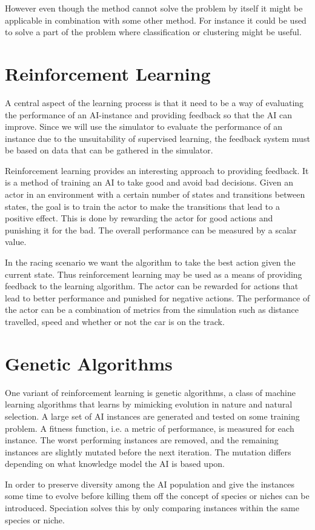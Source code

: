 However even though the method cannot solve the problem by itself it might be applicable in combination with some other method. For instance it could be used to solve a part of the problem where classification or clustering might be useful.

\section{Reinforcement Learning}
A central aspect of the learning process is that it need to be a way of evaluating the performance of an AI-instance and providing feedback so that the AI can improve. Since we will use the simulator to evaluate the performance of an instance due to the unsuitability of supervised learning, the feedback system must be based on data that can be gathered in the simulator. 

Reinforcement learning provides an interesting approach to providing feedback. It is a method of training an AI to take good and avoid bad decisions. Given an actor in an environment with a certain number of states and transitions between states, the goal is to train the actor to make the transitions that lead to a positive effect. This is done by rewarding the actor for good actions and punishing it for the bad.\cite{barber} The overall performance can be measured by a scalar value.

In the racing scenario we want the algorithm to take the best action given the current state. Thus reinforcement learning may be used as a means of providing feedback to the learning algorithm. The actor can be rewarded for actions that lead to better performance and punished for negative actions. The performance of the actor can be a combination of metrics from the simulation such as distance travelled, speed and whether or not the car is on the track.



\section{Genetic Algorithms}
One variant of reinforcement learning is genetic algorithms, a class of machine learning algorithms that learns by mimicking evolution in nature and natural selection. A large set of AI instances are generated and tested on some training problem. A fitness function, i.e. a metric of performance, is measured for each instance. The worst performing instances are removed, and the remaining instances are slightly mutated before the next iteration. The mutation differs depending on what knowledge model the AI is based upon. 

In order to preserve diversity among the AI population and give the instances some time to evolve before killing them off the concept of species or niches can be introduced.\cite{mario} Speciation solves this by only comparing instances within the same species or niche. 